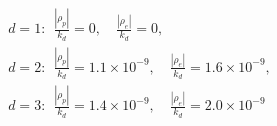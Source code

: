 $$
\begin{gathered}
d=1:\ \ \frac{|\rho_p|}{k_d} = 0,\quad \frac{|\rho_e|}{k_d} = 0,\\
d=2:\ \ \frac{|\rho_p|}{k_d} = 1.1\times10^{-9},\quad \frac{|\rho_e|}{k_d} = 1.6\times10^{-9},\\
d=3:\ \ \frac{|\rho_p|}{k_d} = 1.4\times10^{-9},\quad \frac{|\rho_e|}{k_d} = 2.0\times10^{-9}
\end{gathered}
$$
